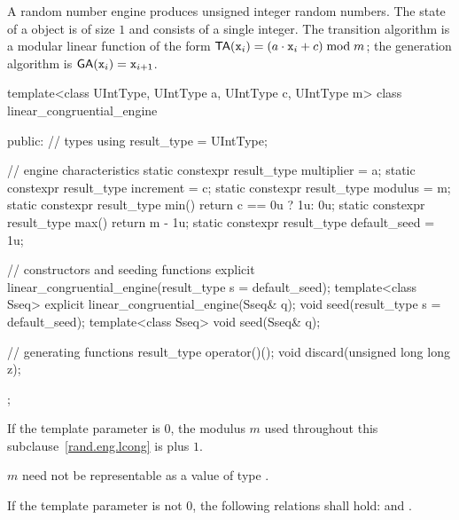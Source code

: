 \pnum
A  random number engine
produces unsigned integer random numbers.
The state%
of a  object 
is of size $1$
and consists of a single integer.
The transition algorithm%
%
is a modular linear function of the form
$\mathsf{TA}(\texttt{x}_{i}) = (a \cdot \texttt{x}_{i} + c) \bmod m$;
the generation algorithm%
%
is $\mathsf{GA}(\texttt{x}_{i}) = \texttt{x}_{i+1}$.

%
\begin{codeblock}
template<class UIntType, UIntType a, UIntType c, UIntType m>
  class linear_congruential_engine {
  public:
    // types
    using result_type = UIntType;

    // engine characteristics
    static constexpr result_type multiplier = a;
    static constexpr result_type increment = c;
    static constexpr result_type modulus = m;
    static constexpr result_type min() { return c == 0u ? 1u: 0u; }
    static constexpr result_type max() { return m - 1u; }
    static constexpr result_type default_seed = 1u;

    // constructors and seeding functions
    explicit linear_congruential_engine(result_type s = default_seed);
    template<class Sseq> explicit linear_congruential_engine(Sseq& q);
    void seed(result_type s = default_seed);
    template<class Sseq> void seed(Sseq& q);

    // generating functions
    result_type operator()();
    void discard(unsigned long long z);
  };
\end{codeblock}

\pnum
If the template parameter
 is $0$,
the modulus $m$
used throughout this subclause~\ref{rand.eng.lcong}
is  plus $1$.
\begin{note}
 $m$ need not be representable
 as a value of type .
\end{note}

\pnum
If the template parameter
 is not $0$,
the following relations shall hold:
and
  .


